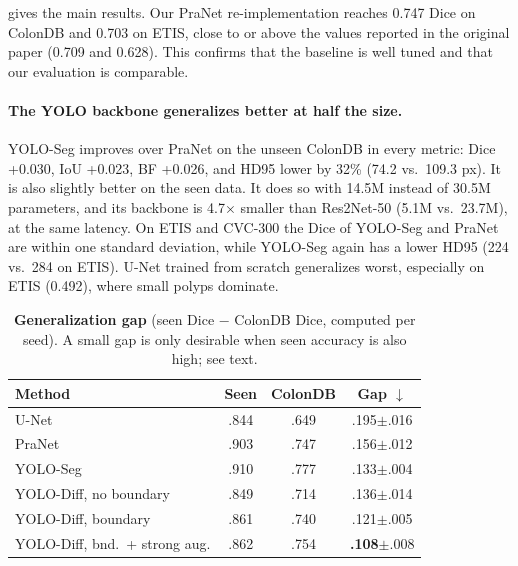 \documentclass[10pt,twocolumn,letterpaper]{article}
\newcommand{\best}[1]{\textbf{#1}}
\newcommand{\pmstd}[1]{{\scriptsize$\pm$#1}}
\begin{document}
 gives the main results. Our PraNet re-implementation reaches 0.747 Dice on ColonDB and 0.703 on ETIS, close to or above the values reported in the original paper (0.709 and 0.628). This confirms that the baseline is well tuned and that our evaluation is comparable.

\paragraph{The YOLO backbone generalizes better at half the size.} YOLO-Seg improves over PraNet on the unseen ColonDB in every metric: Dice +0.030, IoU +0.023, BF +0.026, and HD95 lower by 32\% (74.2 vs.\ 109.3 px). It is also slightly better on the seen data. It does so with 14.5M instead of 30.5M parameters, and its backbone is 4.7$\times$ smaller than Res2Net-50 (5.1M vs.\ 23.7M), at the same latency. On ETIS and CVC-300 the Dice of YOLO-Seg and PraNet are within one standard deviation, while YOLO-Seg again has a lower HD95 (224 vs.\ 284 on ETIS). U-Net trained from scratch generalizes worst, especially on ETIS (0.492), where small polyps dominate.

\begin{table}[t]
\centering
\footnotesize
\setlength{\tabcolsep}{3.5pt}
\begin{tabular}{@{}lccc@{}}
\toprule
Method & Seen & ColonDB & Gap $\downarrow$ \\
\midrule
U-Net & .844 & .649 & .195\pmstd{.016} \\
PraNet & .903 & .747 & .156\pmstd{.012} \\
YOLO-Seg & .910 & .777 & .133\pmstd{.004} \\
YOLO-Diff, no boundary & .849 & .714 & .136\pmstd{.014} \\
YOLO-Diff, boundary & .861 & .740 & .121\pmstd{.005} \\
YOLO-Diff, bnd.\ + strong aug. & .862 & .754 & \best{.108}\pmstd{.008} \\
\bottomrule
\end{tabular}
\caption{\textbf{Generalization gap} (seen Dice $-$ ColonDB Dice, computed per seed). A small gap is only desirable when seen accuracy is also high; see text.}
\label{tab:gap}
\end{table}
\end{document}
